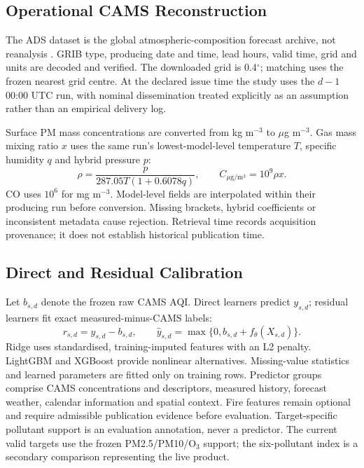 \subsection{Operational CAMS Reconstruction}
The ADS dataset is the global atmospheric-composition forecast archive,
not reanalysis \cite{cams2024forecasts}. GRIB type, producing date and time,
lead hours, valid time, grid and units are decoded and verified. The downloaded
grid is 0.4$^\circ$; matching uses the frozen nearest grid centre. At the declared
issue time the study uses the $d-1$ 00:00 UTC run, with nominal dissemination
treated explicitly as an assumption rather than an empirical delivery log.

Surface PM mass concentrations are converted from kg m$^{-3}$ to $\mu$g m$^{-3}$.
Gas mass mixing ratio $x$ uses the same run's lowest-model-level temperature
$T$, specific humidity $q$ and hybrid pressure $p$:
\begin{equation}
\rho=\frac{p}{287.05T(1+0.6078q)},\qquad C_{\mu\mathrm{g/m^3}}=10^9\rho x.
\label{eq:density}
\end{equation}
CO uses $10^6$ for mg m$^{-3}$. Model-level fields are interpolated within their
producing run before conversion. Missing brackets, hybrid coefficients or
inconsistent metadata cause rejection. Retrieval time records acquisition
provenance; it does not establish historical publication time.

\subsection{Direct and Residual Calibration}
Let $b_{s,d}$ denote the frozen raw CAMS AQI. Direct learners predict $y_{s,d}$;
residual learners fit exact measured-minus-CAMS labels:
\begin{equation}
r_{s,d}=y_{s,d}-b_{s,d},\qquad
\widehat y_{s,d}=\max\{0,b_{s,d}+f_\theta(X_{s,d})\}.\label{eq:residual}
\end{equation}
Ridge uses standardised, training-imputed features with an L2 penalty.
LightGBM and XGBoost provide nonlinear alternatives. Missing-value statistics
and learned parameters are fitted only on training rows. Predictor groups
comprise CAMS concentrations and descriptors, measured history, forecast
weather, calendar information and spatial context. Fire features remain
optional and require admissible publication evidence before evaluation.
Target-specific pollutant support is an evaluation annotation, never a predictor.
The current valid targets use the frozen PM2.5/PM10/O$_3$ support; the
six-pollutant index is a secondary comparison representing the live product.

